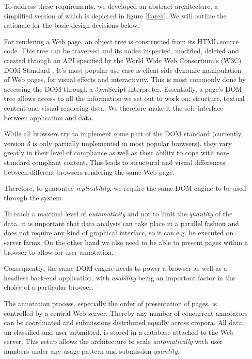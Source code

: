 To address these requirements, we developed an abstract architecture, a simplified version of which is depicted in figure \ref{f:arch}.
We will outline the rationale for the basic design decisions below.


For rendering a Web page, an object tree is constructed from its HTML source code.
This tree can be traversed and its nodes inspected, modified, deleted and created through an API specified by the World Wide Web Consortium's (W3C) DOM Standard \cite{dom}.
It's most popular use case is client-side dynamic manipulation of Web pages, for visual effects and interactivity.
This is most commonly done by accessing the DOM through a JavaScript interpreter.
Essentially, a page's DOM tree allows access to all the information we set out to work on: structure, textual content and visual rendering data.
We therefore make it the sole interface between application and data.

While all browsers try to implement some part of the DOM standard (currently, version 3 is only partially implemented in most popular browsers), they vary greatly in their level of compliance as well as their ability to cope with non-standard compliant content.
This leads to structural and visual differences between different browsers rendering the same Web page.

Therefore, to guarantee \textit{replicability}, we require the same DOM engine to be used through the system.


To reach a maximal level of \textit{automaticity} and not to limit the \textit{quantity} of the data, it is important that data analysis can take place in a parallel fashion and does not require any kind of graphical interface, so it can e.g. be executed on server farms.
On the other hand we also need to be able to present pages within a browser to allow for user annotation.

Consequently, the same DOM engine needs to power a browser as well as a headless back-end application, with \textit{usability} being an important factor in the choice of a particular browser.


The annotation process, especially the order of presentation of pages, is controlled by a central Web server.
Thereby any number of concurrent annotators can be coordinated and submissions distributed equally across cropora.
All data, un-classified and user-submitted, is stored in a database attached to the Web server.
This setup allows the architecture to scale \textit{automatically} with user numbers under any usage pattern and submission \textit{quantity}.


